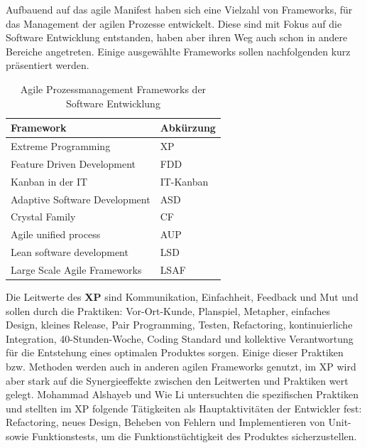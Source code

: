 Aufbauend auf das agile Manifest haben sich eine Vielzahl von Frameworks, für das Management der agilen Prozesse entwickelt. 
Diese sind mit Fokus auf die Software Entwicklung entstanden, haben aber ihren Weg auch schon in andere Bereiche angetreten. 
Einige ausgewählte Frameworks sollen nachfolgenden kurz präsentiert werden. 
\newline
\begin{table}[h!]
    \centering
    \caption{Agile Prozessmanagement Frameworks der Software Entwicklung}
    \label{tab:agile-frameworks}
    \begin{tabular}{|l|l|}
    \hline
    \textbf{Framework}            & \textbf{Abkürzung} \\ \hline
    Extreme Programming           & XP                 \\ \hline
    Feature Driven Development    & FDD                \\ \hline
    Kanban in der IT              & IT-Kanban          \\ \hline
    Adaptive Software Development & ASD                \\ \hline
    Crystal Family                & CF                 \\ \hline
    Agile unified process         & AUP                \\ \hline
    Lean software development     & LSD                \\ \hline
    Large Scale Agile Frameworks  & LSAF               \\ \hline
    \end{tabular}
\end{table} 
\newline
Die Leitwerte des \textbf{XP} sind Kommunikation, Einfachheit, Feedback und Mut und sollen durch die Praktiken:
Vor-Ort-Kunde, Planspiel, Metapher, einfaches Design, kleines Release, Pair Programming, Testen, Refactoring, 
kontinuierliche Integration, 40-Stunden-Woche, Coding Standard und kollektive Verantwortung für die Entstehung 
eines optimalen Produktes sorgen. Einige dieser Praktiken bzw. Methoden werden auch in anderen agilen Frameworks 
genutzt, im XP wird aber stark auf die Synergieeffekte zwischen den Leitwerten und Praktiken wert gelegt. \cite{FOJTIK20111464}
\newline Mohammad Alshayeb und Wie Li untersuchten die spezifischen Praktiken und stellten im XP folgende Tätigkeiten
als Hauptaktivitäten der Entwickler fest: Refactoring, neues Design, Beheben von Fehlern und Implementieren von Unit- 
sowie Funktionstests, um die Funktionstüchtigkeit des Produktes sicherzustellen. \cite{Alshayeb2006-nt} \\

